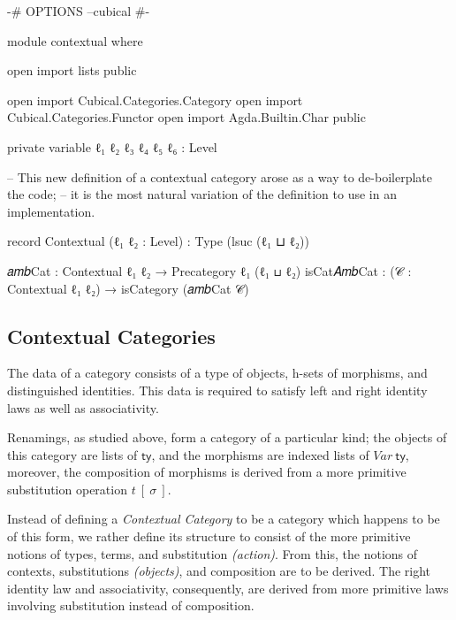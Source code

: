 \begin{code}[hide]
{-# OPTIONS --cubical #-}

module contextual where

open import lists public

open import Cubical.Categories.Category
open import Cubical.Categories.Functor
open import Agda.Builtin.Char public

private
  variable
    ℓ₁ ℓ₂ ℓ₃ ℓ₄ ℓ₅ ℓ₆ : Level

-- This new definition of a contextual category arose as a way to de-boilerplate the code;
-- it is the most natural variation of the definition to use in an implementation.

record Contextual (ℓ₁ ℓ₂ : Level) : Type (lsuc (ℓ₁ ⊔ ℓ₂))

𝑎𝑚𝑏Cat : Contextual ℓ₁ ℓ₂ → Precategory ℓ₁ (ℓ₁ ⊔ ℓ₂)
isCat𝐴𝑚𝑏Cat : (𝒞 : Contextual ℓ₁ ℓ₂) → isCategory (𝑎𝑚𝑏Cat 𝒞)
\end{code}

\subsection{Contextual Categories}

The data of a category consists of a type of objects, h-sets of morphisms, and
distinguished identities. This data is required to satisfy left and right
identity laws as well as associativity.

Renamings, as studied above, form a category of a particular kind; the objects
of this category are lists of $\mathsf{ty}$, and the morphisms are indexed lists
of $\mathit{Var}~\mathsf{ty}$, moreover, the composition of morphisms is derived
from a more primitive substitution operation $t~[~\sigma~]$.

Instead of defining a \emph{Contextual Category} to be a category which happens
to be of this form, we rather define its structure to consist of the more
primitive notions of types, terms, and substitution \emph{(action)}. From this,
the notions of contexts, substitutions \emph{(objects)}, and composition are to be
derived. The right identity law and associativity, consequently, are derived
from more primitive laws involving substitution instead of composition.

